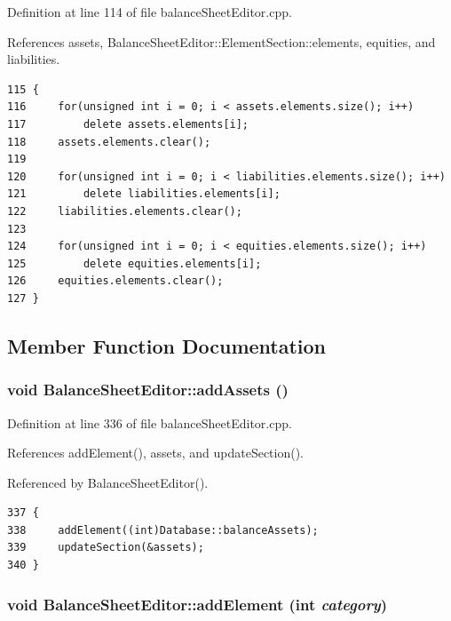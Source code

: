 Definition at line 114 of file balance\-Sheet\-Editor.cpp.

References assets, Balance\-Sheet\-Editor::Element\-Section::elements, equities, and liabilities.

\footnotesize\begin{verbatim}115 {
116     for(unsigned int i = 0; i < assets.elements.size(); i++)
117         delete assets.elements[i];
118     assets.elements.clear();
119     
120     for(unsigned int i = 0; i < liabilities.elements.size(); i++)
121         delete liabilities.elements[i];
122     liabilities.elements.clear();
123     
124     for(unsigned int i = 0; i < equities.elements.size(); i++)
125         delete equities.elements[i];
126     equities.elements.clear();
127 }
\end{verbatim}\normalsize 




\subsection{Member Function Documentation}
\hypertarget{classBalanceSheetEditor_k2}{
\subsubsection[addAssets]{\setlength{\rightskip}{0pt plus 5cm}void Balance\-Sheet\-Editor::add\-Assets ()}}
\label{classBalanceSheetEditor_k2}


Definition at line 336 of file balance\-Sheet\-Editor.cpp.

References add\-Element(), assets, and update\-Section().

Referenced by Balance\-Sheet\-Editor().

\footnotesize\begin{verbatim}337 {
338     addElement((int)Database::balanceAssets);
339     updateSection(&assets);
340 }
\end{verbatim}\normalsize 


\hypertarget{classBalanceSheetEditor_k1}{
\subsubsection[addElement]{\setlength{\rightskip}{0pt plus 5cm}void Balance\-Sheet\-Editor::add\-Element (int {\em category})}}
\label{classBalanceSheetEditor_k1}


